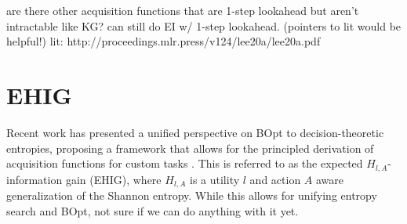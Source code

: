 \documentclass[11pt]{article}
\begin{document}

are there other acquisition functions that are 1-step lookahead but aren't intractable like KG?
can still do EI w/ 1-step lookahead. (pointers to lit would be helpful!)
lit: http://proceedings.mlr.press/v124/lee20a/lee20a.pdf



\appendix

\section{EHIG}
Recent work has presented a unified perspective on BOpt to decision-theoretic entropies, proposing a framework that allows for the principled derivation of acquisition functions for custom tasks \citep{neiswanger2022generalizing}.
This is referred to as the expected $H_{l,A}$-information gain (EHIG),
where $H_{l,A}$ is a utility $l$ and action $A$ aware generalization of the Shannon entropy.
While this allows for unifying entropy search and BOpt, not sure if we can do anything with it yet.
\end{document}
